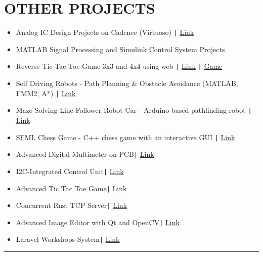 \documentclass[11pt,a4paper]{article}
\begin{document}
\section*{\fontsize{14}{18}\textbf\selectfont OTHER PROJECTS}
\vspace{-0.3cm}
\begin{itemize}[noitemsep, left=0pt, itemsep=5pt]
\item Analog IC Design Projects on Cadence (Virtuoso) \texttt{|} \href{https://github.com/salah0eldin/Analog_Projects}{Link}
\item MATLAB Signal Processing and Simulink Control System Projects
\item Reverse Tic Tac Toe Game 3x3 and 4x4 using web \texttt{|} \href{https://github.com/salah0eldin/Tic_tac_toe_AVOID_THE_X}{Link} \texttt{|} \href{https://salah0eldin.github.io/Tic_tac_toe_AVOID_THE_X/}{Game}
\item Self Driving Robots - Path Planning \& Obstacle Avoidance (MATLAB, FMM2, A*) \texttt{|} \href{https://github.com/salah0eldin/PathPLanningUsingFMM2andAStar}{Link}
\item Maze-Solving Line-Follower Robot Car - Arduino-based pathfinding robot \texttt{|} \href{https://github.com/salah0eldin/ArduinoCarLineFollowerMazeSolver-Saver}{Link}
\item SFML Chess Game - C++ chess game with an interactive GUI \texttt{|} \href{https://github.com/salah0eldin/CHESS_CPP_SFML}{Link}
\item Advanced Digital Multimeter on PCB\texttt{|} {\href{https://www.linkedin.com/feed/update/urn:li:activity:7227981461818138624/}{Link}}
\item I2C-Integrated Control Unit\texttt{|} {\href{https://www.linkedin.com/feed/update/urn:li:activity:7243602012020330497/}{Link}}
\item Advanced Tic Tac Toe Game\texttt{|} {\href{https://www.linkedin.com/posts/salah-eldin-hassen-5bba10250_qt-cplusplus-softwaredevelopment-activity-7227345922031009793-xhzd/?rcm=ACoAAD4WDF8Bk9P5oS-irdrlv53Rzjd03ps4OSA}{Link}}
\item Concurrent Rust TCP Server\texttt{|} {\href{https://github.com/salah0eldin/RustTCPServer}{Link}}
\item Advanced Image Editor with Qt and OpenCV\texttt{|} {\href{https://github.com/salah0eldin/CODSOFT/tree/main/C%2B%2B/Task5%20-%20ImageProcessing/ImageEdit}{Link}}
\item Laravel Workshops System\texttt{|} {\href{https://github.com/salah0eldin/WorkshopsSystem}{Link}}
\end{itemize}
\vspace{-0.6cm}
\rule{\textwidth}{0.3pt}\\
\vspace{-0.5cm}
\centering
\end{document}
